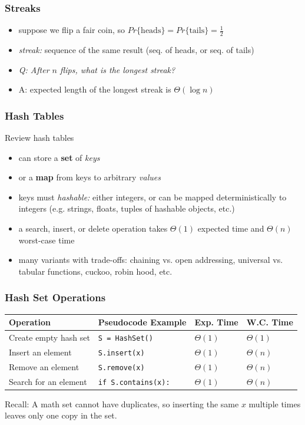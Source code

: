\documentclass[10pt,aspectratio=169]{beamer}
\begin{document}
\begin{frame} \frametitle{Streaks}
\begin{itemize}
  \item suppose we flip a fair coin, so $Pr\{\text{heads}\} = Pr\{\text{tails}\}=\frac{1}{2}$
  \item \emph{streak:} sequence of the same result (seq. of heads, or seq. of tails)
  \item \emph{Q: After $n$ flips, what is the longest streak?}
  \item A: expected length of the longest streak is $\Theta(\log n)$
\end{itemize}
\end{frame}

\begin{frame} \frametitle{Hash Tables}
Review hash tables
\begin{itemize}
  \item can store a \textbf{set} of \emph{keys}
  \item or a \textbf{map} from keys to arbitrary \emph{values}
  \item keys must \emph{hashable:} either integers, or can be mapped deterministically
    to integers (e.g. strings, floats, tuples of hashable objects, etc.)
  \item a search, insert, or delete operation takes $\Theta(1)$ expected time and
    $\Theta(n)$ worst-case time
  \item many variants with trade-offs: chaining vs. open addressing, universal vs.
    tabular functions, cuckoo, robin hood, etc.
\end{itemize}
\end{frame}

\begin{frame} \frametitle{Hash Set Operations}
  \begin{center}
    \begin{tabular}{llll}
      \textbf{Operation} & \textbf{Pseudocode Example} & \textbf{Exp. Time} & \textbf{W.C. Time} \\ \hline
      Create empty hash set & \texttt{S = HashSet()} & $\Theta(1)$ & $\Theta(1)$ \\
      Insert an element & \texttt{S.insert(x)} & $\Theta(1)$ & $\Theta(n)$ \\
      Remove an element & \texttt{S.remove(x)} & $\Theta(1)$ & $\Theta(n)$ \\
      Search for an element & \texttt{if S.contains(x):} & $\Theta(1)$ & $\Theta(n)$ \\
    \end{tabular}
  \end{center}

  \vspace{12pt}
  Recall: A math set cannot have duplicates, so inserting the same $x$ multiple times leaves only one copy in the set.
\end{frame}
\end{document}
